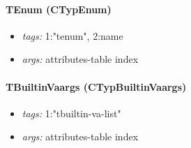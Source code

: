 \documentclass[11pt]{article}
\begin{document}
\paragraph{TEnum (CTypEnum)}
\begin{itemize}
\item \emph{tags:} 1:"tenum", 2:name
\item \emph{args:} attributes-table index
\end{itemize}

\paragraph{TBuiltinVaargs (CTypBuiltinVaargs)}
\begin{itemize}
\item \emph{tags:} 1:"tbuiltin-va-list"
\item \emph{args:} attributes-table index
\end{itemize}


\end{document}
